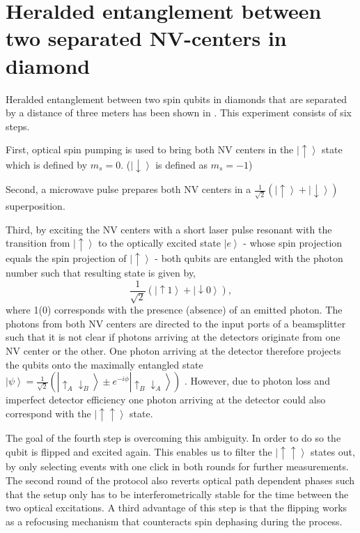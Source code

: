 \color{tudelft-cyan}
\section{Heralded entanglement between two separated NV-centers in diamond}
\color{black}
\label{entanglement}
Heralded entanglement between two spin qubits in diamonds that are separated by a distance of three meters has been shown in \cite{bernien2013heralded}. This experiment consists of six steps. 

First, optical spin pumping is used to bring both NV centers in the $\left| \uparrow \right> $ state which is defined by $m_s \mathrm{= 0}$. ($\left| \downarrow \right> $ is defined as $m_s \mathrm{= -1}$)

Second, a microwave pulse prepares both NV centers in a $ \frac{1}{\sqrt{2}} \left( \left| \uparrow \right> + \left| \downarrow \right> \right)$ superposition.

Third, by exciting the NV centers with a short laser pulse resonant with the transition from $\left| \uparrow \right> $ to the optically excited state $\left| e \right>$ - whose spin projection equals the spin projection of $\left| \uparrow \right> $ - both qubits are entangled with the photon number such that resulting state is given by,
\begin{equation}
\frac{1}{\sqrt{2}} \left( \left| \uparrow 1 \right> + \left| \downarrow 0 \right> \right),
\end{equation}
where 1(0) corresponds with the presence (absence) of an emitted photon. The photons from both NV centers are directed to the input ports of a beamsplitter such that it is not clear if photons arriving at the detectors originate from one NV center or the other. One photon arriving at the detector therefore projects the qubits onto the maximally entangled state $\left| \psi \right> = \frac{1}{\sqrt{2}} \left( \left| \uparrow_A \downarrow_B \right> \pm e^{-i\phi}\left| \uparrow_B \downarrow_A \right>\right)$ . However, due to photon loss and imperfect detector efficiency one photon arriving at the detector could also correspond with the $\left| \uparrow \uparrow \right>$ state. 

The goal of the fourth step is overcoming this ambiguity. In order to do so the qubit is flipped and excited again. This enables us to filter the $\left| \uparrow \uparrow \right>$ states out, by only selecting events with one click in both rounds for further measurements. The second round of the protocol also reverts optical path dependent phases such that the setup only has to be interferometrically stable for the time between the two optical excitations.  A third advantage of this step is that the flipping works as a refocusing mechanism that counteracts spin dephasing during the process.

